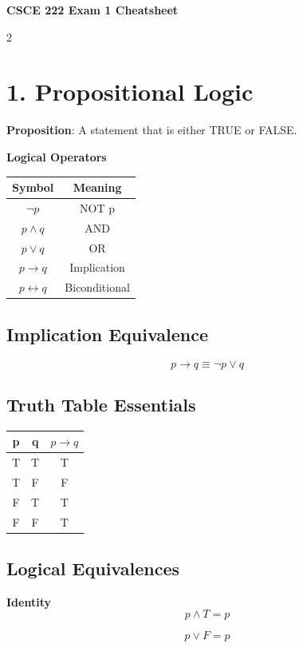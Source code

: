 \documentclass[10pt]{article}
\begin{document}
\begin{center}
{\Large \textbf{CSCE 222 Exam 1 Cheatsheet}}
\end{center}

\begin{multicols}{2}

\section*{1. Propositional Logic}

\textbf{Proposition}: A statement that is either TRUE or FALSE.

\textbf{Logical Operators}

\begin{tabular}{c|c}
Symbol & Meaning \\
\hline
$\neg p$ & NOT p \\
$p \land q$ & AND \\
$p \lor q$ & OR \\
$p \rightarrow q$ & Implication \\
$p \leftrightarrow q$ & Biconditional
\end{tabular}

\subsection*{Implication Equivalence}

\[
p \rightarrow q \equiv \neg p \lor q
\]

\subsection*{Truth Table Essentials}

\begin{tabular}{c c | c}
p & q & $p \rightarrow q$ \\
\hline
T & T & T \\
T & F & F \\
F & T & T \\
F & F & T
\end{tabular}

\subsection*{Logical Equivalences}

\textbf{Identity}
\[
p \land T = p
\]

\[
p \lor F = p
\]


\end{multicols}
\end{document}
